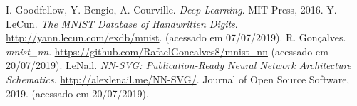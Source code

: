 \documentclass[a0,portrait]{a0poster}
\begin{document}
\begin{multicols}{2}
{\large
\begin{thebibliography}{9}
        I. Goodfellow, Y. Bengio, A. Courville.
        \textit{Deep Learning}.
        MIT Press, 2016.
        Y. LeCun.
        \textit{The MNIST Database of Handwritten Digits}.
        \url{http://yann.lecun.com/exdb/mnist}.
        (acessado em 07/07/2019).
        R. Gonçalves.
        \textit{mnist\_nn}.
        \url{https://github.com/RafaelGoncalves8/mnist_nn}
        (acessado em 20/07/2019).
        LeNail.
        \textit{NN-SVG: Publication-Ready Neural Network Architecture Schematics}.
        \url{http://alexlenail.me/NN-SVG/}.
        Journal of Open Source Software, 2019.
        (acessado em 20/07/2019).
\end{thebibliography}
}
\end{multicols}
\end{document}
